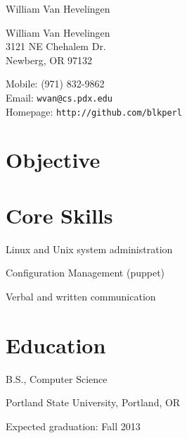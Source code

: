 \documentclass[10pt,letterpaper]{article}
\def\name{William Van Hevelingen}
\renewenvironment{itemize}{
  \begin{list}{}{
    \setlength{\leftmargin}{1.5em}
    \setlength{\itemsep}{0.25em}
    \setlength{\parskip}{0pt}
    \setlength{\parsep}{0.25em}
  }
}{
  \end{list}
}
\begin{document}
{\huge \name}


\vspace{0.25in}

\begin{minipage}[t]{0.5\textwidth}
  William Van Hevelingen\\
  3121 NE Chehalem Dr.\\
  Newberg, OR 97132
\end{minipage}
\begin{minipage}[t]{0.5\textwidth}
  Mobile: (971) 832-9862 \\
  Email: \texttt{wvan@cs.pdx.edu} \\
  Homepage: \texttt{http://github.com/blkperl} \\
\end{minipage}

\section*{Objective}


\begin{minipage}[t]{0.5\textwidth}
\section*{Core Skills}
\begin{itemize}
\item Linux and Unix system administration
\item Configuration Management (puppet) 
\item Verbal and written communication
\end{itemize}
\end{minipage}
\begin{minipage}[t]{0.5\textwidth}
\section*{Education}
\begin{itemize}

  \item B.S., Computer Science
  \item Portland State University, Portland, OR
  \item Expected graduation: Fall 2013
  
\end{itemize}
\end{minipage}
\end{document}
